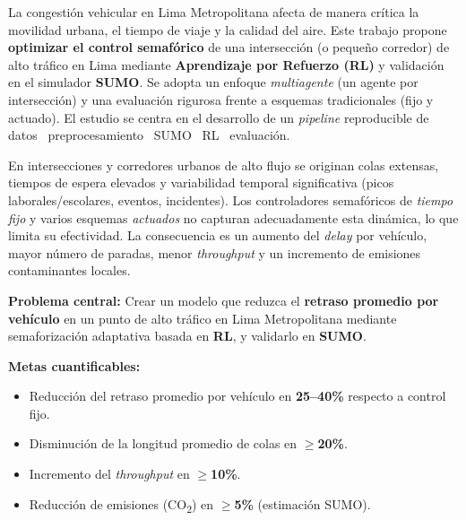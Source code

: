 

La congestión vehicular en Lima Metropolitana afecta de manera crítica la movilidad urbana, el tiempo de viaje y la calidad del aire. Este trabajo propone \textbf{optimizar el control semafórico} de una intersección (o pequeño corredor) de alto tráfico en Lima mediante \textbf{Aprendizaje por Refuerzo (RL)} y validación en el simulador \textbf{SUMO}. Se adopta un enfoque \textit{multiagente} (un agente por intersección) y una evaluación rigurosa frente a esquemas tradicionales (fijo y actuado). El estudio se centra en el desarrollo de un \textit{pipeline} reproducible de datos \textrightarrow\ preprocesamiento \textrightarrow\ SUMO \textrightarrow\ RL \textrightarrow\ evaluación. 


En intersecciones y corredores urbanos de alto flujo se originan colas extensas, tiempos de espera elevados y variabilidad temporal significativa (picos laborales/escolares, eventos, incidentes). Los controladores semafóricos de \textit{tiempo fijo} y varios esquemas \textit{actuados} no capturan adecuadamente esta dinámica, lo que limita su efectividad. La consecuencia es un aumento del \textit{delay} por vehículo, mayor número de paradas, menor \textit{throughput} y un incremento de emisiones contaminantes locales.


\textbf{Problema central:} Crear un modelo que reduzca el \textbf{retraso promedio por vehículo} en un punto de alto tráfico en Lima Metropolitana mediante semaforización adaptativa basada en \textbf{RL}, y validarlo en \textbf{SUMO}.

\textbf{Metas cuantificables:}
\begin{itemize}
    \item Reducción del retraso promedio por vehículo en \textbf{25–40\%} respecto a control fijo.
    \item Disminución de la longitud promedio de colas en \textbf{$\geq$20\%}.
    \item Incremento del \textit{throughput} en \textbf{$\geq$10\%}.
    \item Reducción de emisiones (CO\textsubscript{2}) en \textbf{$\geq$5\%} (estimación SUMO).
\end{itemize}

